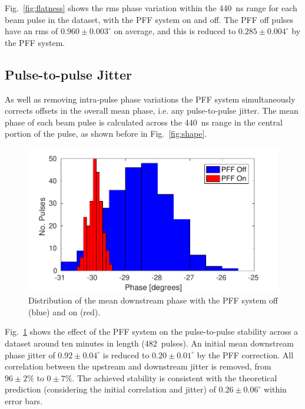 \documentclass[%
 reprint,
 amsmath,amssymb,
 prl,
]{revtex4-1}
\begin{document}
Fig.~\ref{fig:flatness} shows the rms phase variation within the 440~ns range 
for each beam pulse in the dataset, with the PFF system on and off. The PFF off 
pulses have an rms of \(0.960\pm0.003^\circ\) on average, and this is reduced 
to \(0.285\pm0.004^\circ\) by the PFF system.


\subsection{\label{ss:meanJit}Pulse-to-pulse Jitter}

As well as removing intra-pulse phase variations the PFF system simultaneously 
corrects offsets in the overall mean phase, i.e. any pulse-to-pulse jitter. The 
mean phase of each beam pulse is calculated across the 440~ns range in the 
central portion of the pulse, as shown before in Fig.~\ref{fig:shape}.

\begin{figure}
	\includegraphics[width=\columnwidth]{figs/meanJit}%
	\caption{\label{fig:meanJit}Distribution of the mean downstream phase with 
		the 
		PFF system off (blue) and on (red).}
\end{figure}

Fig.~\ref{fig:meanJit} shows the effect of the PFF system on the pulse-to-pulse 
stability across a dataset around ten minutes in length (482~pulses). An 
initial mean downstream phase jitter of \(0.92\pm0.04^\circ\) is reduced to \(0.20\pm0.01^\circ\) by the PFF 
correction. All correlation between the upstream and downstream jitter is removed, from 
\(96\pm2\%\) to \(0\pm7\%\). The achieved stability is consistent with the theoretical prediction (considering the initial correlation and jitter) of \(0.26\pm0.06^\circ\) within error bars.
\end{document}
